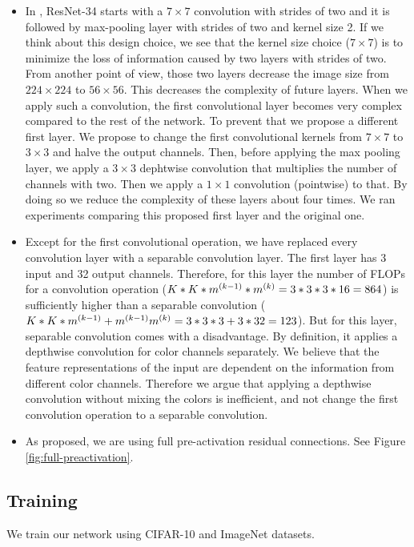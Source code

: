 \begin{itemize}
\item In \cite{He:2015aa}, ResNet-34 starts with a $7 \times 7$ convolution with strides of two and it is followed by max-pooling layer with strides of two and kernel size 2. If we think about this design choice, we see that the kernel size choice ($7 \times 7$) is to minimize the loss of information caused by two layers with strides of two. From another point of view, those two layers decrease the image size from $224 \times 224$ to $56 \times 56$. This decreases the complexity of future layers. When we apply such a convolution, the first convolutional layer becomes very complex compared to the rest of the network. To prevent that we propose a different first layer. We propose to change the first convolutional kernels from $7 \times 7$ to $3 \times 3$ and halve the output channels. Then, before applying the max pooling layer, we apply a $3 \times 3$ dephtwise convolution that multiplies the number of channels with two. Then we apply a $1 \times 1$ convolution (pointwise) to that.  By doing so we reduce the complexity of these layers about four times. We ran experiments comparing this proposed first layer and the original one.
\item Except for the first convolutional operation, we have replaced every convolution layer with a separable convolution layer. The first layer has 3 input and 32 output channels. Therefore, for this layer the number of FLOPs for a convolution operation ($K*K*m^{(k-1)}*m^{(k)} = 3*3*3*16 = 864$) is sufficiently higher than a separable convolution ($K*K*m^{(k-1)} + m^{(k-1)}m^{(k)} = 3*3*3 + 3*32=123$). But for this layer, separable convolution comes with a disadvantage. By definition, it applies a depthwise convolution for color channels separately. We believe that the feature representations of the input are dependent on the information from different color channels. Therefore we argue that applying a depthwise convolution without mixing the colors is inefficient, and not change the first convolution operation to a separable convolution.
\item As \cite{he2016identity} proposed, we are using full pre-activation residual connections. See Figure \ref{fig:full-preactivation}.
\end{itemize}

\subsection{Training}
We train our network using CIFAR-10 and ImageNet datasets. 

